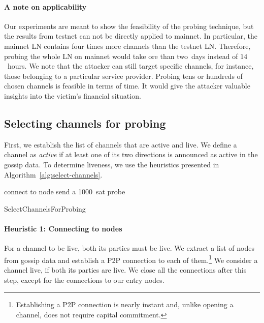 \paragraph{A note on applicability}
Our experiments are meant to show the feasibility of the probing technique, but the results from testnet can not be directly applied to mainnet.
In particular, the mainnet LN contains four times more channels than the testnet LN\@.
Therefore, probing the whole LN on mainnet would take ore than two~days instead of $14$~hours.
We note that the attacker can still target specific channels, for instance, those belonging to a particular service provider.
Probing tens or hundreds of chosen channels is feasible in terms of time.
It would give the attacker valuable insights into the victim's financial situation.


\subsection{Selecting channels for probing}

First, we establish the list of channels that are active and live.
We define a channel as \textit{active} if at least one of its two directions is announced as active in the gossip data.
To determine liveness, we use the heuristics presented in Algorithm~\ref{alg:select-channels}.

\begin{algorithm}
	 {
		connect to node\;
	}
	 {
		send a 1000~sat probe\;
	}
	\caption{SelectChannelsForProbing}
	\label{alg:select-channels}
\end{algorithm}

\paragraph{Heuristic 1: Connecting to nodes}
For a channel to be live, both its parties must be live.
We extract a list of nodes from gossip data and establish a P2P connection to each of them.\footnote{Establishing a P2P connection is nearly instant and, unlike opening a channel, does not require capital commitment.}
We consider a channel live, if both its parties are live.
We close all the connections after this step, except for the connections to our entry nodes.

